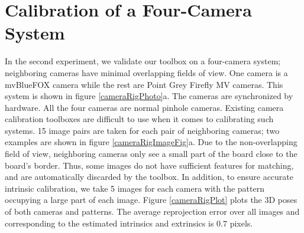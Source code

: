 \documentclass{report}
\begin{document}
\section{Calibration of a Four-Camera System}
In the second experiment, we validate our toolbox on a four-camera system; neighboring cameras have minimal overlapping fields of view. One camera is a mvBlueFOX camera while the rest are Point Grey Firefly MV cameras. This system is shown in figure \ref{cameraRigPhoto}a. The cameras are synchronized by hardware. All the four cameras are normal pinhole cameras. Existing camera calibration toolboxes are difficult to use when it comes to calibrating such systems. 15 image pairs are taken for each pair of neighboring cameras; two examples are shown in figure \ref{cameraRigImageFig}a. Due to the non-overlapping field of view, neighboring cameras only see a small part of the board close to the board's border. Thus, some images do not have sufficient features for matching, and are automatically discarded by the toolbox. In addition, to ensure accurate intrinsic calibration, we take 5 images for each camera with the pattern occupying a large part of each image. Figure \ref{cameraRigPlot} plots the 3D poses of both cameras and patterns. The average reprojection error over all images and corresponding to the estimated intrinsics and extrinsics is $0.7$ pixels. 

\end{document}
